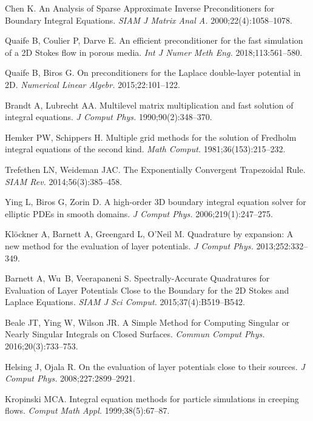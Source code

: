 \documentclass[AMA,STIX1COL]{WileyNJD-v2}
\begin{document}
\begin{thebibliography}{10}
Chen K. {An Analysis of Sparse Approximate Inverse Preconditioners for Boundary
  Integral Equations}.  {\it SIAM J Matrix Anal A. }2000;22(4):1058--1078.

Quaife B, Coulier P, Darve E. {An efficient preconditioner for the fast
  simulation of a 2D Stokes flow in porous media}.  {\it Int J Numer Meth Eng.
  }2018;113:561--580.

Quaife B, Biros G. {On preconditioners for the Laplace double-layer potential
  in 2D}.  {\it Numerical Linear Algebr. }2015;22:101--122.

Brandt A, Lubrecht AA. {Multilevel matrix multiplication and fast solution of
  integral equations}.  {\it J Comput Phys. }1990;90(2):348--370.

Hemker PW, Schippers H. Multiple grid methods for the solution of {F}redholm
  integral equations of the second kind.  {\it Math Comput.
  }1981;36(153):215--232.

Trefethen LN, Weideman JAC. {The Exponentially Convergent Trapezoidal Rule}.
  {\it SIAM Rev. }2014;56(3):385--458.

Ying L, Biros G, Zorin D. {A high-order 3D boundary integral equation solver
  for elliptic PDEs in smooth domains}.  {\it J Comput Phys.
  }2006;219(1):247--275.

Kl\"{o}ckner A, Barnett A, Greengard L, O'Neil M. {Quadrature by expansion: A
  new method for the evaluation of layer potentials}.  {\it J Comput Phys.
  }2013;252:332--349.

Barnett A, Wu~B, Veerapaneni S. {Spectrally-Accurate Quadratures for Evaluation
  of Layer Potentials Close to the Boundary for the 2D Stokes and Laplace
  Equations}.  {\it SIAM J Sci Comput. }2015;37(4):B519--B542.

Beale JT, Ying W, Wilson JR. {A Simple Method for Computing Singular or Nearly
  Singular Integrals on Closed Surfaces}.  {\it Commun Comput Phys.
  }2016;20(3):733--753.

Helsing J, Ojala R. On the evaluation of layer potentials close to their
  sources.  {\it J Comput Phys. }2008;227:2899--2921.

Kropinski MCA. Integral equation methods for particle simulations in creeping
  flows.  {\it Comput Math Appl. }1999;38(5):67--87.


\end{thebibliography}
\end{document}

